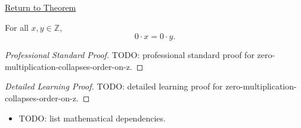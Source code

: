 \newpage
{}
\label{prf:zero-multiplication-collapses-order-on-z}

\begin{remark*}[Return]
\hyperref[thm:zero-multiplication-collapses-order-on-z]{Return to Theorem}
\end{remark*}

\begin{theorem*}
For all $x,y\in\mathbb{Z}$,
\[
0\cdot x=0\cdot y.
\]
\end{theorem*}

\begin{proof}[Professional Standard Proof]
\LRAProofBodyStart
TODO: professional standard proof for zero-multiplication-collapses-order-on-z.
\end{proof}

\begin{proof}[Detailed Learning Proof]
\LRAProofBodyStart
TODO: detailed learning proof for zero-multiplication-collapses-order-on-z.
\end{proof}

\begin{remark*}
\end{remark*}

\begin{dependencies}
\begin{itemize}
  \item TODO: list mathematical dependencies.
\end{itemize}
\end{dependencies}

\clearpage
